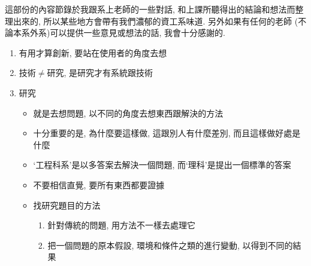 
這部份的內容節錄於我跟系上老師的一些對話, 和上課所聽得出的結論和想法而整理出來的, 所以某些地方會帶有我們濃郁的資工系味道. 另外如果有任何的老師 (不論本系外系)可以提供一些意見或想法的話, 我會十分感謝的.


\begin{enumerate}
  \item
  {
    有用才算創新, 要站在使用者的角度去想
  } %

  \item
  {
    技術$\neq$研究, 是研究才有系統跟技術
  } %

  \item
  {
    研究
    \begin{itemize}
      \item
      {
        就是去想問題, 以不同的角度去想東西跟解決的方法
      } %

      \item
      {
        十分重要的是, 為什麼要這樣做, 這跟別人有什麼差別, 而且這樣做好處是什麼
      } %

      \item
      {
        `工程科系'是以多答案去解決一個問題, 而`理科'是提出一個標準的答案
      } %

      \item
      {
        不要相信直覺, 要所有東西都要證據
      } %

      \item
      {
        找研究題目的方法
      } %

      \begin{enumerate}
        \item
        {
          針對傳統的問題, 用方法不一樣去處理它
        } %

        \item
        {
          把一個問題的原本假設, 環境和條件之類的進行變動, 以得到不同的結果
        } %
      \end{enumerate}
    \end{itemize}
  } %


\end{enumerate}
